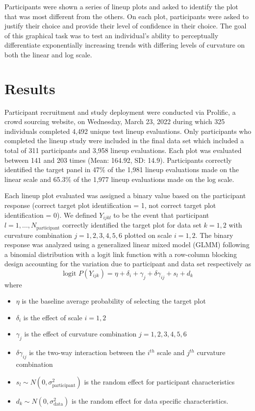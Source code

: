 \documentclass[12pt]{article}
\begin{document}
Participants were shown a series of lineup plots and asked to identify
the plot that was most different from the others. On each plot,
participants were asked to justify their choice and provide their level
of confidence in their choice. The goal of this graphical task was to
test an individual's ability to perceptually differentiate exponentially
increasing trends with differing levels of curvature on both the linear
and log scale.

\hypertarget{results}{%
\section{Results}\label{results}}

Participant recruitment and study deployment were conducted via
Prolific, a crowd sourcing website, on Wednesday, March 23, 2022 during
which 325 individuals completed 4,492 unique test lineup evaluations.
Only participants who completed the lineup study were included in the
final data set which included a total of 311 participants and 3,958
lineup evaluations. Each plot was evaluated between 141 and 203 times
(Mean: 164.92, SD: 14.9). Participants correctly identified the target
panel in 47\% of the 1,981 lineup evaluations made on the linear scale
and 65.3\% of the 1,977 lineup evaluations made on the log scale.

Each lineup plot evaluated was assigned a binary value based on the
participant response (correct target plot identification = 1, not
correct target plot identification = 0). We defined \(Y_{ijkl}\) to be
the event that participant \(l = 1,...,N_\text{participant}\) correctly
identified the target plot for data set \(k = 1,2\) with curvature
combination \(j = 1,2,3,4,5,6\) plotted on scale \(i = 1,2\). The binary
response was analyzed using a generalized linear mixed model (GLMM)
following a binomial distribution with a logit link function with a
row-column blocking design accounting for the variation due to
participant and data set respectively as \begin{equation}
\text{logit }P(Y_{ijk}) = \eta + \delta_i + \gamma_j + \delta \gamma_{ij} + s_l + d_k
\end{equation} \noindent where

\begin{itemize}
\item $\eta$ is the baseline average probability of selecting the target plot
\item $\delta_i$ is the effect of scale $i = 1,2$
\item $\gamma_j$ is the effect of curvature combination $j = 1,2,3,4,5,6$
\item $\delta\gamma_{ij}$ is the two-way interaction between the $i^{th}$ scale and $j^{th}$ curvature combination
\item $s_l \sim N(0,\sigma^2_\text{participant})$ is the random effect for participant characteristics
\item $d_k \sim N(0,\sigma^2_{\text{data}})$ is the random effect for data specific characteristics. 
\end{itemize}
\end{document}
